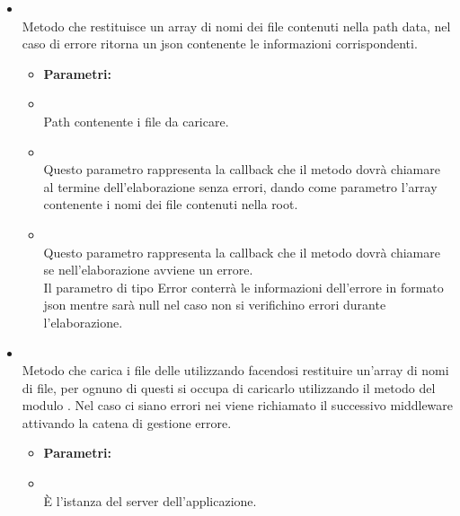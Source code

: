 \begin{itemize}
\item[] \textbf{} \\ Metodo che restituisce un array di nomi dei file contenuti nella path  data, nel caso di errore ritorna un json contenente le informazioni corrispondenti.
\begin{itemize}\addtolength{\itemsep}{-0.5\baselineskip}
\item[] \textbf{Parametri:}
\item[]  \\ Path contenente i file  da caricare.
\item[]  \\ Questo parametro rappresenta la callback che il metodo dovrà chiamare al termine dell'elaborazione senza errori, dando come parametro l'array contenente i nomi dei file contenuti nella root.
\item[]  \\ Questo parametro rappresenta la callback che il metodo dovrà chiamare se nell'elaborazione avviene un errore. \\ Il parametro di tipo Error conterrà le informazioni dell'errore in formato json mentre sarà null nel caso non si verifichino errori durante l'elaborazione.
\end{itemize}
\item[] \textbf{} \\ Metodo che carica i file  delle  utilizzando  facendosi restituire un'array di nomi di file, per ognuno di questi si occupa di caricarlo utilizzando il metodo  del modulo . Nel caso ci siano errori nei  viene richiamato il successivo middleware attivando la catena di gestione errore.
\begin{itemize}\addtolength{\itemsep}{-0.5\baselineskip}
\item[] \textbf{Parametri:}
\item[]  \\ È l'istanza del server dell'applicazione.
\end{itemize}
\end{itemize}

